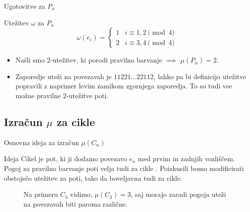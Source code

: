 \documentclass{beamer}
\begin{document}
\begin{frame}{Ugotovitve za $P_n$}
	\begin{block}{Utežitev $\omega$ za $P_n$}
		$$
		\omega(e_i) = \begin{cases}
			1 &i \equiv 1,2 \pmod{4}\\ 
			2 &i \equiv 3,4 \pmod{4}
		\end{cases}
		$$
	\end{block}
\pause
	\begin{itemize}
		\item Našli smo $2$-utežitev, ki porodi pravilno barvanje $\implies$  $\mu(P_n) = 2$. \pause
		\item Zaporedje uteži na povezavah je $11221\ldots 22112$, lahko pa bi definicijo utežitve popravili z naprimer levim zamikom zgornjega zaporedja. To so tudi vse možne pravilne $2$-utežitve poti.
	\end{itemize}
\end{frame}

\subsection{Izračun $\mu$ za cikle}
\begin{frame}{Osnovna ideja za izračun $\mu(C_n)$}
	\begin{block}{Ideja}
		Cikel je pot, ki ji dodamo povezavo $e_n$ med prvim in zadnjih vozliščem. Pogoj za pravilno barvanje poti velja tudi za cikle . Poizkusili bomo modificirati obstoječo utežitev za poti, tako da boveljavna tudi za cikle.
	\end{block}

\begin{figure}
	\caption{Na primeru $C_3$ vidimo, $\mu(C_3) = 3$, saj morajo zaradi pogoja uteži na povezavah biti paroma različne.}
\end{figure}
\end{frame}
\end{document}
